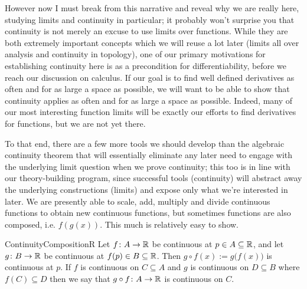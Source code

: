\documentclass[11pt]{article}
\begin{document}
However now I must break from this narrative and reveal why we are really here, studying limits and continuity in particular; it probably won't surprise you that continuity is not merely an excuse to use limits over functions. While they are both extremely important concepts which we will reuse a lot later (limits all over analysis and continuity in topology), one of our primary motivations for establishing continuity here is as a precondition for differentiability, before we reach our discussion on calculus. If our goal is to find well defined derivatives as often and for as large a space as possible, we will want to be able to show that continuity applies as often and for as large a space as possible. Indeed, many of our most interesting function limits will be exactly our efforts to find derivatives for functions, but we are not yet there.

To that end, there are a few more tools we should develop than the algebraic continuity theorem that will essentially eliminate any later need to engage with the underlying limit question when we prove continuity; this too is in line with our theory-building program, since successful tools (continuity) will abstract away the underlying constructions (limits) and expose only what we're interested in later. We are presently able to scale, add, multiply and divide continuous functions to obtain new continuous functions, but sometimes functions are also composed, i.e. $f(g(x))$. This much is relatively easy to show.

\begin{label corollary}{ContinuityCompositionR}
Let $f\colon A \to \mathbb{R}$ be continuous at $p \in A \subseteq \mathbb{R}$, and let $g \colon B \to \mathbb{R}$ be continuous at $f(p) \in B \subseteq \mathbb{R}$. Then $g\circ f(x) := g\big( f(x)\big)$ is continuous at $p$. If $f $ is continuous on $C \subseteq A$ and $g$ is continuous on $D \subseteq B$ where $f(C) \subseteq D$ then we say that $g\circ f\colon A \to \mathbb{R}$ is continuous on $C$.
\end{label corollary}
\end{document}
